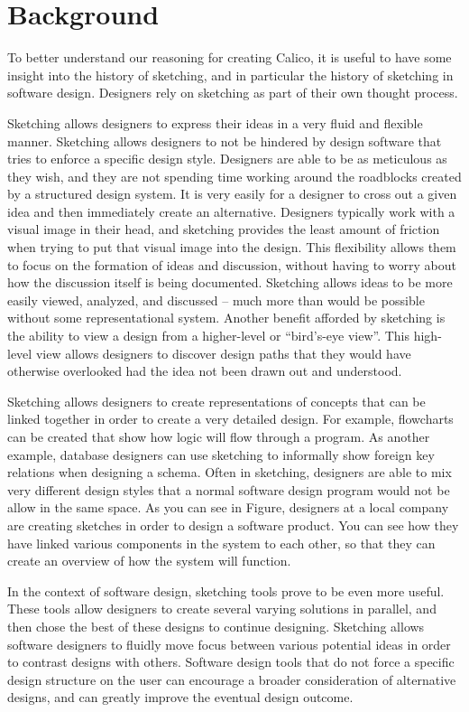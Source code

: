\chapter{Background}


To better understand our reasoning for creating Calico, it is useful to have some insight into the history of sketching, and in particular the history of sketching in software design. Designers rely on sketching as part of their own thought process.

Sketching allows designers to express their ideas in a very fluid and flexible manner.
Sketching allows designers to not be hindered by design software that tries to enforce a specific design style. Designers are able to be as meticulous as they wish, and they are not spending time working around the roadblocks created by a structured design system.
It is very easily for a designer to cross out a given idea and then immediately create an alternative. Designers typically work with a visual image in their head\cite{todo}, and sketching provides the least amount of friction when trying to put that visual image into the design.
This flexibility allows them to focus on the formation of ideas and discussion, without having to worry about how the discussion itself is being documented. 
Sketching allows ideas to be more easily viewed, analyzed, and discussed -- much more than would be possible without some representational system.
Another benefit afforded by sketching is the ability to view a design from a higher-level or ``bird’s-eye view''.
This high-level view allows designers to discover design paths that they would have otherwise overlooked had the idea not been drawn out and understood. 

Sketching allows designers to create representations of concepts that can be linked together in order to create a very detailed design. For example, flowcharts can be created that show how logic will flow through a program. As another example, database designers can use sketching to informally show foreign key relations when designing a schema. Often in sketching, designers are able to mix very different design styles that a normal software design program would not be allow in the same space. As you can see in Figure, designers at a local company are creating sketches in order to design a software product. You can see how they have linked various components in the system to each other, so that they can create an overview of how the system will function.

In the context of software design, sketching tools prove to be even more useful. These tools allow designers to create several varying solutions in parallel, and then chose the best of these designs to continue designing. Sketching allows software designers to fluidly move focus between various potential ideas in order to contrast designs with others. Software design tools that do not force a specific design structure on the user can encourage a broader consideration of alternative designs, and can greatly improve the eventual design outcome.
